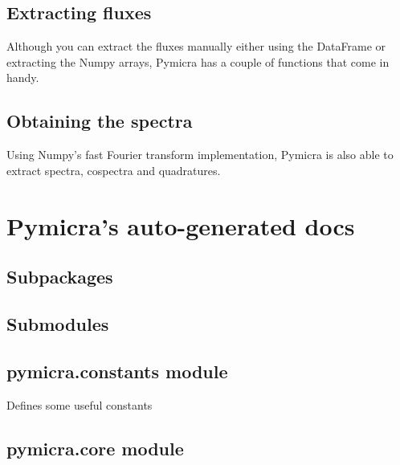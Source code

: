 \documentclass[a4paper,10pt,oneside]{sphinxmanual}
\begin{document}
\section{Extracting fluxes}
\label{tutorial:extracting-fluxes}
Although you can extract the fluxes manually either using the DataFrame or extracting
the Numpy arrays, Pymicra has a couple of functions that come in handy.


\section{Obtaining the spectra}
\label{tutorial:obtaining-the-spectra}
Using Numpy's fast Fourier transform implementation, Pymicra is also able to extract
spectra, cospectra and quadratures.


\chapter{Pymicra's auto-generated docs}
\label{pymicra:pymicra-s-auto-generated-docs}\label{pymicra::doc}

\section{Subpackages}
\label{pymicra:subpackages}

\section{Submodules}
\label{pymicra:submodules}

\section{pymicra.constants module}
\label{pymicra:module-pymicra.constants}\label{pymicra:pymicra-constants-module}
Defines some useful constants


\section{pymicra.core module}
\label{pymicra:module-pymicra.core}\label{pymicra:pymicra-core-module}
\end{document}
